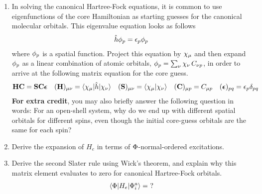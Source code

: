 \documentclass[11pt]{article}
\numberwithin{equation}{section}
\begin{document}
\begin{enumerate}
\item
  In solving the canonical Hartree-Fock equations, it is common to use eigenfunctions of the core Hamiltonian as starting guesses for the canonical molecular orbitals.
  This eigenvalue equation looks as follows
  \begin{align*}
    \hat{h}
    \phi _{p}
  =
    \epsilon _{p}
    \phi _{p}
  \end{align*}
  where $\phi _p$ is a spatial function.
  Project this equation by $\x_\mu$ and then expand $\phi _p$ as a linear combination of atomic orbitals, $\f_p=\sum_\nu \x_\nu\, C_{\nu p}$, in order to arrive at the following matrix equation for the core guess.
  \begin{align*}
    \bo{H}\bo{C}
  =
    \bo{S}\bo{C}\bm{\ev}
  &&
    (\bo{H})_{\mu\nu}
  =
    \ip{\x_\mu|\op{h}|\x_\nu}
  &&
    (\bo{S})_{\mu\nu}
  =
    \ip{\x_\mu|\x_\nu}
  &&
    (\bo{C})_{\mu p}
  =
    C_{\mu p}
  &&
    (\bm{\ev})_{pq}
  =
    \ev_p\d_{pq}
  \end{align*}
  \textbf{For extra credit}, you may also briefly answer the following question in words: For an open-shell system, why do we end up with different spatial orbitals for different spins, even though the initial core-guess orbitals are the same for each spin?
  
  

\newpage
\item
  Derive the expansion of $H_e$ in terms of $\Phi $-normal-ordered excitations.


\newpage
\item
  Derive the second Slater rule using Wick's theorem, and explain why this matrix element evaluates to zero for canonical Hartree-Fock orbitals.
  \begin{align*}
    \langle\Phi |H_e|\Phi _i^a\rangle
  =
    \,\,?
  \end{align*}
\end{enumerate}
\end{document}
